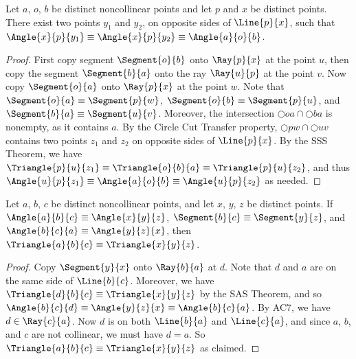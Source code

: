 \documentclass{article}
\begin{document}
\begin{construct}
Let $a$, $o$, $b$ be distinct noncollinear points and let $p$ and $x$ be distinct points. There exist two points $y_1$ and $y_2$, on opposite sides of $\Line{p}{x}$, such that $\Angle{x}{p}{y_1} \equiv \Angle{x}{p}{y_2} \equiv \Angle{a}{o}{b}$. 
\end{construct}

\begin{proof}
First copy segment $\Segment{o}{b}$ onto $\Ray{p}{x}$ at the point $u$, then copy the segment $\Segment{b}{a}$ onto the ray $\Ray{u}{p}$ at the point $v$. Now copy $\Segment{o}{a}$ onto $\Ray{p}{x}$ at the point $w$. Note that $\Segment{o}{a} \equiv \Segment{p}{w}$, $\Segment{o}{b} \equiv \Segment{p}{u}$, and $\Segment{b}{a} \equiv \Segment{u}{v}$. Moreover, the intersection $\Circle{o}{a} \cap \Circle{b}{a}$ is nonempty, as it contains $a$. By the Circle Cut Transfer property, $\Circle{p}{w} \cap \Circle{u}{v}$ contains two points $z_1$ and $z_2$ on opposite sides of $\Line{p}{x}$. By the SSS Theorem, we have $\Triangle{p}{u}{z_1} \equiv \Triangle{o}{b}{a} \equiv \Triangle{p}{u}{z_2}$, and thus $\Angle{u}{p}{z_1} \equiv \Angle{a}{o}{b} \equiv \Angle{u}{p}{z_2}$ as needed.
\end{proof}

\begin{prop}
Let $a$, $b$, $c$ be distinct noncollinear points, and let $x$, $y$, $z$ be distinct points. If $\Angle{a}{b}{c} \equiv \Angle{x}{y}{z}$, $\Segment{b}{c} \equiv \Segment{y}{z}$, and $\Angle{b}{c}{a} \equiv \Angle{y}{z}{x}$, then $\Triangle{a}{b}{c} \equiv \Triangle{x}{y}{z}$.
\end{prop}

\begin{proof}
Copy $\Segment{y}{x}$ onto $\Ray{b}{a}$ at $d$. Note that $d$ and $a$ are on the same side of $\Line{b}{c}$. Moreover, we have $\Triangle{d}{b}{c} \equiv \Triangle{x}{y}{z}$ by the SAS Theorem, and so $\Angle{b}{c}{d} \equiv \Angle{y}{z}{x} \equiv \Angle{b}{c}{a}$. By AC7, we have $d \in \Ray{c}{a}$. Now $d$ is on both $\Line{b}{a}$ and $\Line{c}{a}$, and since $a$, $b$, and $c$ are not collinear, we must have $d = a$. So $\Triangle{a}{b}{c} \equiv \Triangle{x}{y}{z}$ as claimed.
\end{proof}
\end{document}
